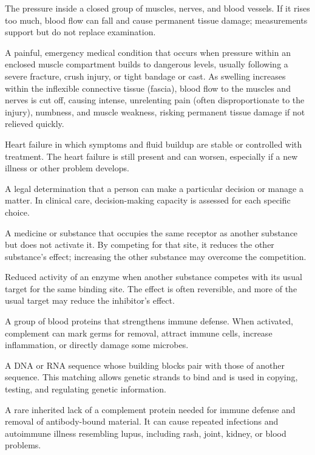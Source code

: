  The pressure inside a closed group of muscles, nerves, and blood vessels. If it rises too much, blood flow can fall and cause permanent tissue damage; measurements support but do not replace examination.

 A painful, emergency medical condition that occurs when pressure within an enclosed muscle compartment builds to dangerous levels, usually following a severe fracture, crush injury, or tight bandage or cast. As swelling increases within the inflexible connective tissue (fascia), blood flow to the muscles and nerves is cut off, causing intense, unrelenting pain (often disproportionate to the injury), numbness, and muscle weakness, risking permanent tissue damage if not relieved quickly.

 Heart failure in which symptoms and fluid buildup
are stable or controlled with treatment. The heart failure is still present and can
worsen, especially if a new illness or other problem develops.

 A legal determination that a person can make a particular decision or manage a matter. In clinical care, decision-making capacity is assessed for each specific choice.

 A medicine or substance that occupies the same receptor as another substance but does not activate it. By competing for that site, it reduces the other substance's effect; increasing the other substance may overcome the competition.

 Reduced activity of an enzyme when another substance competes with its usual target for the same binding site. The effect is often reversible, and more of the usual target may reduce the inhibitor's effect.

 A group of blood proteins that strengthens immune defense. When activated, complement can mark germs for removal, attract immune cells, increase inflammation, or directly damage some microbes.

 A DNA or RNA sequence whose building blocks pair with those of another sequence. This matching allows genetic strands to bind and is used in copying, testing, and regulating genetic information.

 A rare inherited lack of a complement protein needed for immune defense and removal of antibody-bound material. It can cause repeated infections and autoimmune illness resembling lupus, including rash, joint, kidney, or blood problems.


